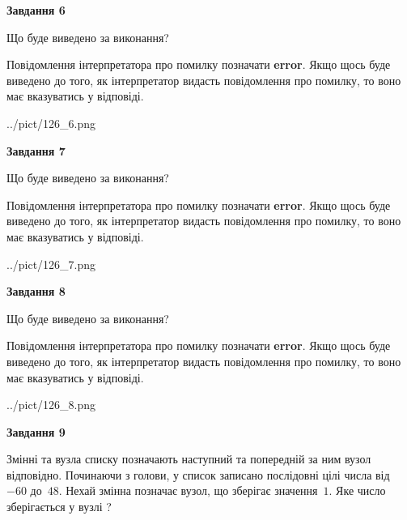 \documentclass[12pt, ukrainian]{article}
\begin{document}
{\begin {large}
{\begin {center}\textbf{Завдання 6}\end {center}}\par
Що буде виведено за виконання?

Повідомлення інтерпретатора про помилку позначати \textbf{error}.
Якщо щось буде виведено до того, як інтерпретатор видасть повідомлення про помилку, 
то воно має вказуватись у відповіді. \par


\begin{center}
	{../pict/126_6.png}
\end{center}
\newpage

{\begin {center}\textbf{Завдання 7}\end {center}}\par
Що буде виведено за виконання?

Повідомлення інтерпретатора про помилку позначати \textbf{error}.
Якщо щось буде виведено до того, як інтерпретатор видасть повідомлення про помилку, 
то воно має вказуватись у відповіді. \par


\begin{center}
	{../pict/126_7.png}
\end{center}
\newpage

{\begin {center}\textbf{Завдання 8}\end {center}}\par
Що буде виведено за виконання?

Повідомлення інтерпретатора про помилку позначати \textbf{error}.
Якщо щось буде виведено до того, як інтерпретатор видасть повідомлення про помилку, 
то воно має вказуватись у відповіді. \par


\begin{center}
	{../pict/126_8.png}
\end{center}
\newpage

{\begin {center}\textbf{Завдання 9}\end {center}}\par
Змінні  та  вузла списку позначають наступний та попередній за ним вузол відповідно. Починаючи з голови, у список записано послідовні цілі числа від~$-60$ до~$48$. Нехай змінна  позначає вузол, що зберігає значення~$1$.
Яке число зберігається у вузлі  ?\par
\newpage


\end{large}}
\end{document}
